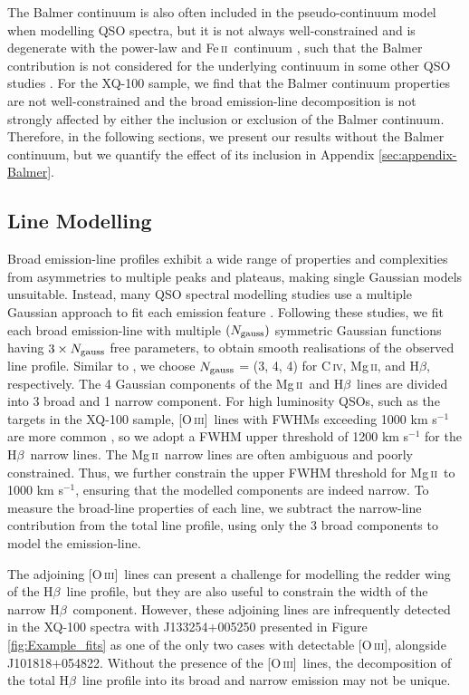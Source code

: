 \documentclass[fleqn,usenatbib]{mnras}
\newcommand{\mgii}{Mg\,\textsc{ii}}
\newcommand{\civ}{C\,\textsc{iv}}
\newcommand{\feii}{Fe\,\textsc{ii}}
\newcommand{\oiii}{[O\,\textsc{iii}]}
\newcommand{\hbeta}{H\textsc{$\beta$}}
\begin{document}
The Balmer continuum is also often included in the pseudo-continuum model when modelling QSO spectra, but it is not always well-constrained and is degenerate with the power-law and \feii\ continuum \citep[e.g.,][]{Wang_2009, Shen_2012}, such that the Balmer contribution is not considered for the underlying continuum in some other QSO studies \citep[e.g.,][]{Shen_2011}. For the XQ-100 sample, we find that the Balmer continuum properties are not well-constrained and the broad emission-line decomposition is not strongly affected by either the inclusion or exclusion of the Balmer continuum. Therefore, in the following sections, we present our results without the Balmer continuum, but we quantify the effect of its inclusion in Appendix \ref{sec:appendix-Balmer}.

\subsection {Line Modelling} \label{sec:line-fitting}
Broad emission-line profiles exhibit a wide range of properties and complexities from asymmetries to multiple peaks and plateaus, making single Gaussian models unsuitable. Instead, many QSO spectral modelling studies use a multiple Gaussian approach to fit each emission feature \citep[e.g.,][]{Greene_2005, Shen_2011, Rakshit_2020}. Following these studies, we fit each broad emission-line with multiple $(N_{\rm{gauss}})$ symmetric Gaussian functions having $3 \times N_{\rm{gauss}}$ free parameters, to obtain smooth realisations of the observed line profile. Similar to \citet{Rakshit_2020}, we choose $N_{\rm{gauss}}$ = (3, 4, 4) for \civ, \mgii, and \hbeta, respectively. The 4 Gaussian components of the \mgii\ and \hbeta\ lines are divided into 3 broad and 1 narrow component. For high luminosity QSOs, such as the targets in the XQ-100 sample, \oiii\ lines with FWHMs exceeding 1000 km s$^{-1}$ are more common \citep[e.g.][]{Shen_2012, Coatman_2019}, so we adopt a FWHM upper threshold of 1200 km s$^{-1}$ for the \hbeta\ narrow lines. The \mgii\ narrow lines are often ambiguous and poorly constrained. Thus, we further constrain the upper FWHM threshold for \mgii\ to 1000 km s$^{-1}$, ensuring that the modelled components are indeed narrow. To measure the broad-line properties of each line, we subtract the narrow-line contribution from the total line profile, using only the 3 broad components to model the emission-line.

The adjoining \oiii\ lines can present a challenge for modelling the redder wing of the \hbeta\ line profile, but they are also useful to constrain the width of the narrow \hbeta\ component. However, these adjoining lines are infrequently detected in the XQ-100 spectra with J133254$+$005250 presented in Figure \ref{fig:Example_fits} as one of the only two cases with detectable \oiii, alongside J101818$+$054822. Without the presence of the \oiii\ lines, the decomposition of the total \hbeta\ line profile into its broad and narrow emission may not be unique.
\end{document}
